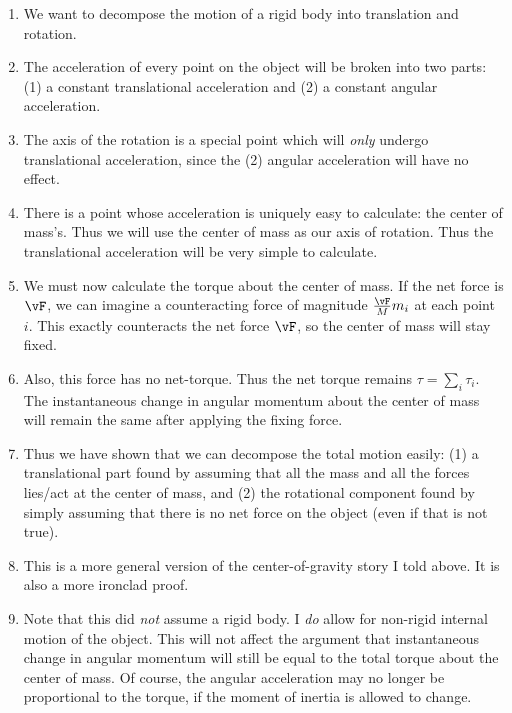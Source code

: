 \begin{enumerate}
  \item We want to decompose the motion of a rigid body into translation
  and rotation.

  \item The acceleration of every point on the object will be broken
  into two parts: (1) a constant translational acceleration and (2)
  a constant angular acceleration.

  \item The axis of the rotation is a special point which will
  \emph{only} undergo translational acceleration, since the (2) angular
  acceleration will have no effect.

  \item There is a point whose acceleration is uniquely easy to
  calculate: the center of mass's. Thus we will use the center of mass
  as our axis of rotation. Thus the translational acceleration will be
  very simple to calculate.

  \item We must now calculate the torque about the center of mass. If
  the net force is $\vF$, we can imagine a counteracting force of
  magnitude $\frac{\vF}{M}m_i$ at each point $i$. This exactly
  counteracts the net force $\vF$, so the center of mass will stay
  fixed.

  \item Also, this force has no net-torque. Thus the net torque remains
  $\tau = \sum_i \tau_i$. The instantaneous change in angular momentum
  about the center of mass will remain the same after applying the
  fixing force.

  \item Thus we have shown that we can decompose the total motion
  easily: (1) a translational part found by assuming that all the mass
  and all the forces lies/act at the center of mass, and (2) the
  rotational component found by simply assuming that there is no net
  force on the object (even if that is not true).

  \item This is a more general version of the center-of-gravity story I
  told above. It is also a more ironclad proof.

  \item Note that this did \emph{not} assume a rigid body. I \emph{do}
  allow for non-rigid internal motion of the object. This will not
  affect the argument that instantaneous change in angular momentum will
  still be equal to the total torque about the center of mass. Of
  course, the angular acceleration may no longer be proportional to the
  torque, if the moment of inertia is allowed to change.
\end{enumerate}
